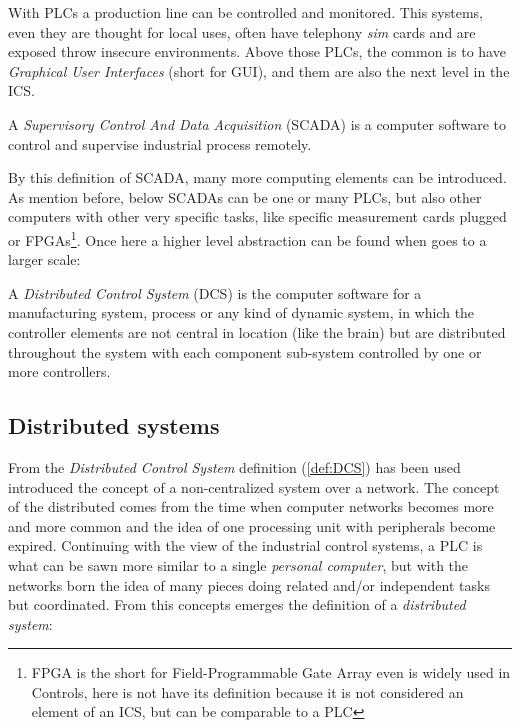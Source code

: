 \documentclass[10pt,a4paper,twoside]{llncs}
\begin{document}
With PLCs a production line can be controlled and monitored. This systems, even they are thought for local uses, often have telephony \emph{sim} cards and are exposed throw insecure environments. Above those PLCs, the common is to have \emph{Graphical User Interfaces} (short for GUI), and them are also the next level in the ICS.

\begin{definition}\label{def:SCADA}
    A \emph{Supervisory Control And Data Acquisition} (SCADA) is a computer software to control and supervise industrial process remotely.
\end{definition}

By this definition of SCADA, many more computing elements can be introduced. As mention before, below SCADAs can be one or many PLCs, but also other computers with other very specific tasks, like specific measurement cards plugged or FPGAs\footnote{FPGA is the short for Field-Programmable Gate Array even is widely used in Controls, here is not have its definition because it is not considered an element of an ICS, but can be comparable to a PLC}. Once here a higher level abstraction can be found when goes to a larger scale:

\begin{definition}\label{def:DCS}
    A \emph{Distributed Control System} (DCS) is the computer software for a manufacturing system, process or any kind of dynamic system, in which the controller elements are not central in location (like the brain) but are distributed throughout the system with each component sub-system controlled by one or more controllers.
\end{definition}

\subsection{Distributed systems}\label{sec:DistrSys}

From the \emph{Distributed Control System} definition (\ref{def:DCS}) has been used introduced the concept of a non-centralized system over a network. The concept of the distributed comes from the time when computer networks becomes more and more common and the idea of one processing unit with peripherals become expired. Continuing with the view of the industrial control systems, a PLC is what can be sawn more similar to a single \emph{personal computer}, but with the networks born the idea of many pieces doing related and/or independent tasks but coordinated. From this concepts emerges the definition of a \emph{distributed system}:
\end{document}
